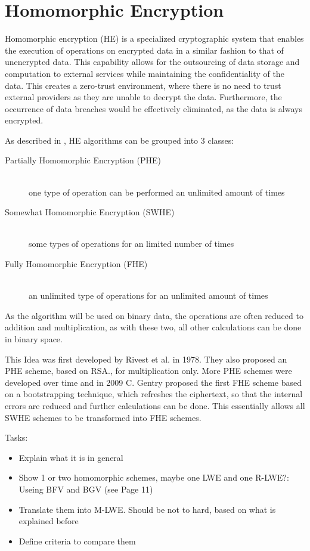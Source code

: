 \chapter{Homomorphic Encryption}

Homomorphic encryption (HE) is a specialized cryptographic system that enables the execution of operations on encrypted data in a similar fashion to that of unencrypted data. This capability allows for the outsourcing of data storage and computation to external services while maintaining the confidentiality of the data. This creates a zero-trust environment, where there is no need to trust external providers as they are unable to decrypt the data. Furthermore, the occurrence of data breaches would be effectively eliminated, as the data is always encrypted.


As described in \cite{FheImplementations}, HE algorithms can be grouped into 3 classes:
\begin{description}
    \item [Partially Homomorphic Encryption (PHE)]\hfill \\one type of operation can be performed an unlimited amount of times
    \item [Somewhat Homomorphic Encryption (SWHE)]\hfill \\some types of operations for an limited number of times
    \item [Fully Homomorphic Encryption (FHE)]\hfill \\an unlimited type of operations for an unlimited amount of times
\end{description}

As the algorithm will be used on binary data, the operations are often reduced to addition and multiplication, as with these two, all other calculations can be done in binary space.

This Idea was first developed by Rivest et al. \cite{Rivest1978} in 1978. They also proposed an PHE scheme, based on RSA., for multiplication only. More PHE schemes were developed over time and in 2009 C. Gentry proposed the first FHE scheme \cite{Gentry2009AFH} based on a bootstrapping technique, which refreshes the ciphertext, so that the internal errors are reduced and further calculations can be done. This essentially allows all SWHE schemes to be transformed into FHE schemes.



Tasks:
\begin{itemize}
  \item Explain what it is in general
  \item Show 1 or two homomorphic schemes, maybe one LWE and one R-LWE?: Useing BFV and BGV (see \cite{FheImplementations} Page 11)
  \item Translate them into M-LWE. Should be not to hard, based on what is explained before
  \item Define criteria to compare them
\end{itemize}